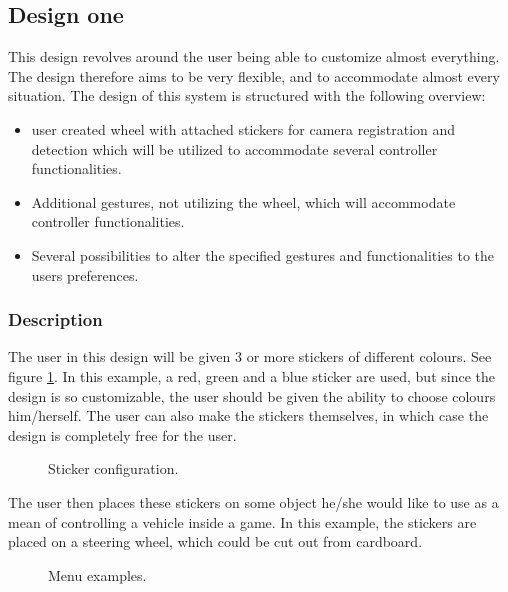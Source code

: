 \subsection{Design one}
\label{design1}
This design revolves around the user being able to customize almost everything. The design therefore aims to be very flexible, and to accommodate almost every situation. The design of this system is structured with the following overview:

\begin{itemize}
\item user created wheel with attached stickers for camera registration and detection which will be utilized to accommodate several controller functionalities.
\item Additional gestures, not utilizing the wheel, which will accommodate controller functionalities.
\item Several possibilities to alter the specified gestures and functionalities to the users preferences. 
\end{itemize}


\subsubsection*{Description}
The user in this design will be given 3 or more stickers of different colours. See figure \ref{fig:wheel}. In this example, a red, green and a blue sticker are used, but since the design is so customizable, the user should be given the ability to choose colours him/herself. The user can also make the stickers themselves, in which case the design is completely free for the user.


\begin{figure}[!htbp]
\centering
{}
\caption{Sticker configuration.}\label{fig:wheel}
\end{figure}

The user then places these stickers on some object he/she would like to use as a mean of controlling a vehicle inside a game. In this example, the stickers are placed on a steering wheel, which could be cut out from cardboard.

\begin{figure}[!htbp]
\centering
{}
\caption{Menu examples.}\label{fig:select}
\end{figure}

